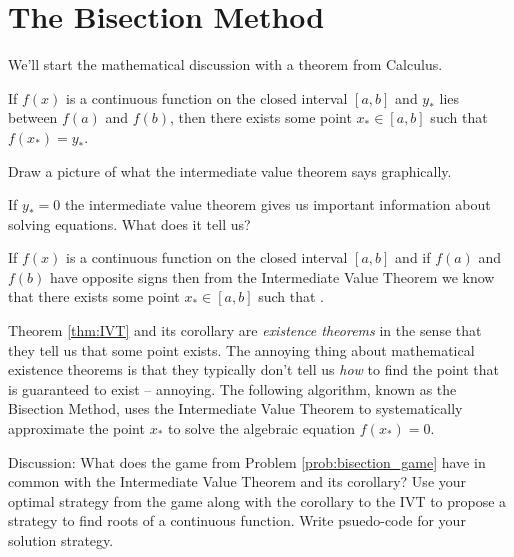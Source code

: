 \newpage
\section{The Bisection Method}
We'll start the mathematical discussion with a theorem from Calculus.
\begin{thm}
    If $f(x)$ is a continuous function on the closed interval $[a,b]$ and $y_*$ lies between
    $f(a)$ and $f(b)$, then there exists some point $x_* \in [a,b]$ such that $f(x_*) = y_*$.
    \label{thm:IVT}
\end{thm}


\begin{problem}
    Draw a picture of what the intermediate value theorem says graphically.
\end{problem}

\begin{problem}
    If $y_*=0$ the intermediate value theorem gives us important information about solving
    equations.  What does it tell us?
\end{problem}

\begin{cor}
    If $f(x)$ is a continuous function on the closed interval $[a,b]$ and if $f(a)$ and $f(b)$ have opposite
    signs then from the Intermediate Value Theorem we know that there exists some point
    $x_* \in [a,b]$ such that \underline{\hspace{1in}}.
\end{cor}

Theorem \ref{thm:IVT} and its corollary are {\it existence theorems} in the sense that
they tell us that some point exists.  The annoying thing about mathematical existence
theorems is that they typically don't tell us {\it how} to find the point that is guaranteed to
exist -- annoying.
The following algorithm, known as the Bisection Method, uses the Intermediate
Value Theorem to systematically approximate the point $x_*$ to solve the algebraic
equation $f(x_*) =
0$.

\begin{problem}
    Discussion: What does the game from Problem \ref{prob:bisection_game} have in common
    with the Intermediate Value Theorem
    and its corollary?  Use your optimal strategy from the game along with
    the corollary to the IVT to propose a strategy to find roots of a continuous function.
    Write psuedo-code for your solution strategy.
\end{problem}

